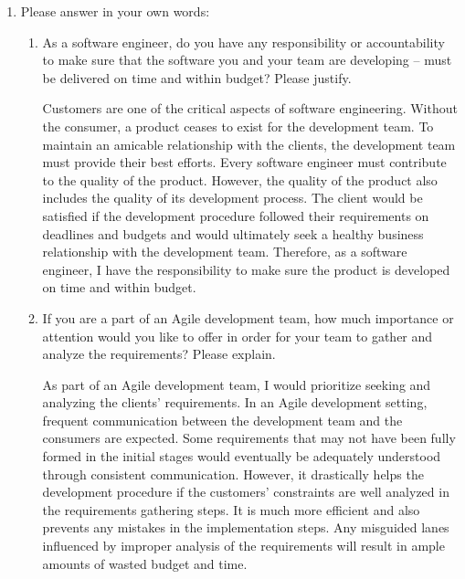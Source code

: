 \documentclass[12pt]{article}
\begin{document}
  \begin{enumerate}[resume]

    \item Please answer in your own words:

    \begin{enumerate}
      \item As a software engineer, do you have any responsibility or accountability to make sure that the software you and your team are developing – must be delivered on time and within budget? Please justify.

      Customers are one of the critical aspects of software engineering. Without the consumer, a product ceases to exist for the development team. To maintain an amicable relationship with the clients, the development team must provide their best efforts. Every software engineer must contribute to the quality of the product. However, the quality of the product also includes the quality of its development process. The client would be satisfied if the development procedure followed their requirements on deadlines and budgets and would ultimately seek a healthy business relationship with the development team. Therefore, as a software engineer, I have the responsibility to make sure the product is developed on time and within budget. 

      \item If you are a part of an Agile development team, how much importance or attention would you like to offer in order for your team to gather and analyze the requirements? Please explain.

      As part of an Agile development team, I would prioritize seeking and analyzing the clients' requirements. In an Agile development setting, frequent communication between the development team and the consumers are expected. Some requirements that may not have been fully formed in the initial stages would eventually be adequately understood through consistent communication. However, it drastically helps the development procedure if the customers' constraints are well analyzed in the requirements gathering steps. It is much more efficient and also prevents any mistakes in the implementation steps. Any misguided lanes influenced by improper analysis of the requirements will result in ample amounts of wasted budget and time.


    \end{enumerate}

  \end{enumerate}
\end{document}
